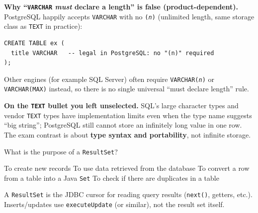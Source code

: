 \begin{solution}
  \medskip\noindent\textbf{Why ``\texttt{VARCHAR} \emph{must} declare a length'' is false (product-dependent).} PostgreSQL happily accepts \texttt{VARCHAR} with no \texttt{(\textit{n})} (unlimited length, same storage class as \texttt{TEXT} in practice):
\begin{lstlisting}[style=sqlexam]
CREATE TABLE ex (
  title VARCHAR   -- legal in PostgreSQL: no "(n)" required
);
\end{lstlisting}
  Other engines (for example SQL Server) often require \texttt{VARCHAR(\textit{n})} or \texttt{VARCHAR(MAX)} instead, so there is no single universal ``must declare length'' rule.

  \medskip\noindent\textbf{On the \texttt{TEXT} bullet you left unselected.} SQL's large character types and vendor \texttt{TEXT} types have implementation limits even when the type name suggests ``big string''; PostgreSQL still cannot store an infinitely long value in one row. The exam contrast is about \textbf{type syntax and portability}, not infinite storage.
\end{solution}

\newpage 


\question[4]
What is the purpose of a \texttt{ResultSet}?
\begin{choices}
  \choice To create new records
  \CorrectChoice To use data retrieved from the database
  \choice To convert a row from a table into a Java \texttt{Set}
  \choice To check if there are duplicates in a table
\end{choices}
\begin{solution}
  A \texttt{ResultSet} is the JDBC cursor for reading query results (\texttt{next()}, getters, etc.). Inserts/updates use \texttt{executeUpdate} (or similar), not the result set itself.
\end{solution}

